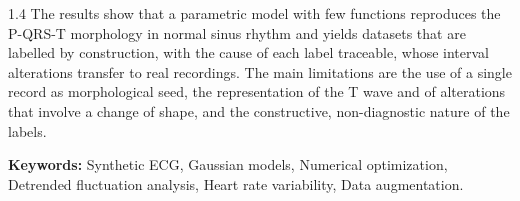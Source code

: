 \begin{spacing}{1.4}
The results show that a parametric model with few functions reproduces the P-QRS-T morphology in normal sinus rhythm and yields datasets that are labelled by construction, with the cause of each label traceable, whose interval alterations transfer to real recordings. The main limitations are the use of a single record as morphological seed, the representation of the T wave and of alterations that involve a change of shape, and the constructive, non-diagnostic nature of the labels.


\vspace{0.5cm}

\noindent\textbf{Keywords:} Synthetic ECG, Gaussian models, Numerical optimization, Detrended fluctuation analysis, Heart rate variability, Data augmentation.

\end{spacing}
